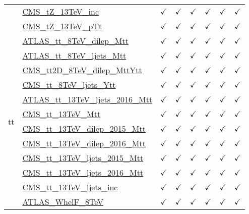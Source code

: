 \documentclass{article}
\begin{document}
\begin{longtable}{|c|l|c|c|c|c|c|c|}
 & \href{https://arxiv.org}{CMS_tZ_13TeV_inc}  & $\checkmark$ & $\checkmark$ & $\checkmark$ & $\checkmark$ & $\checkmark$ & $\checkmark$\\ \cline{2-8}
 & \href{https://arxiv.org}{CMS_tZ_13TeV_pTt}  & $\checkmark$ & $\checkmark$ & $\checkmark$ & $\checkmark$ & $\checkmark$ & $\checkmark$
\\ \hline
\multirow{17}{*}{tt}
 & \href{https://arxiv.org}{ATLAS_tt_8TeV_dilep_Mtt}  & $\checkmark$ & $\checkmark$ & $\checkmark$ & $\checkmark$ & $\checkmark$ & $\checkmark$\\ \cline{2-8}
 & \href{https://arxiv.org}{ATLAS_tt_8TeV_ljets_Mtt}  & $\checkmark$ & $\checkmark$ & $\checkmark$ & $\checkmark$ & $\checkmark$ & $\checkmark$\\ \cline{2-8}
 & \href{https://arxiv.org}{CMS_tt2D_8TeV_dilep_MttYtt}  & $\checkmark$ & $\checkmark$ & $\checkmark$ & $\checkmark$ & $\checkmark$ & $\checkmark$\\ \cline{2-8}
 & \href{https://arxiv.org}{CMS_tt_8TeV_ljets_Ytt}  & $\checkmark$ & $\checkmark$ & $\checkmark$ & $\checkmark$ & $\checkmark$ & $\checkmark$\\ \cline{2-8}
 & \href{https://arxiv.org}{ATLAS_tt_13TeV_ljets_2016_Mtt}  & $\checkmark$ & $\checkmark$ & $\checkmark$ & $\checkmark$ & $\checkmark$ & $\checkmark$\\ \cline{2-8}
 & \href{https://arxiv.org}{CMS_tt_13TeV_Mtt}  & $\checkmark$ & $\checkmark$ & $\checkmark$ & $\checkmark$ & $\checkmark$ & $\checkmark$\\ \cline{2-8}
 & \href{https://arxiv.org}{CMS_tt_13TeV_dilep_2015_Mtt}  & $\checkmark$ & $\checkmark$ & $\checkmark$ & $\checkmark$ & $\checkmark$ & $\checkmark$\\ \cline{2-8}
 & \href{https://arxiv.org}{CMS_tt_13TeV_dilep_2016_Mtt}  & $\checkmark$ & $\checkmark$ & $\checkmark$ & $\checkmark$ & $\checkmark$ & $\checkmark$\\ \cline{2-8}
 & \href{https://arxiv.org}{CMS_tt_13TeV_ljets_2015_Mtt}  & $\checkmark$ & $\checkmark$ & $\checkmark$ & $\checkmark$ & $\checkmark$ & $\checkmark$\\ \cline{2-8}
 & \href{https://arxiv.org}{CMS_tt_13TeV_ljets_2016_Mtt}  & $\checkmark$ & $\checkmark$ & $\checkmark$ & $\checkmark$ & $\checkmark$ & $\checkmark$\\ \cline{2-8}
 & \href{https://arxiv.org}{CMS_tt_13TeV_ljets_inc}  & $\checkmark$ & $\checkmark$ & $\checkmark$ & $\checkmark$ & $\checkmark$ & $\checkmark$\\ \cline{2-8}
 & \href{https://arxiv.org}{ATLAS_WhelF_8TeV}  & $\checkmark$ & $\checkmark$ & $\checkmark$ & $\checkmark$ & $\checkmark$ & $\checkmark$\\ \cline{2-8}

\end{longtable}
\end{document}
